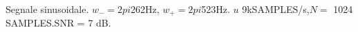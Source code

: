 Segnale sinusoidale. $w_{-}=2pi$262Hz, $w_{+}=2pi$523Hz. $
u$ 9kSAMPLES/s,$N=$ 1024 SAMPLES.SNR = 7 dB.